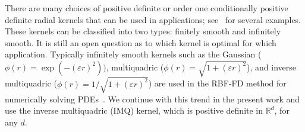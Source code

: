 \documentclass[smallextended]{svjour3}
\newcommand{\ep}{\varepsilon}
\begin{document}
There are many choices of positive definite or order one conditionally positive definite radial kernels that can be used in applications; see~\cite[Ch. 4, 8, 11]{Fasshauer:2007} for several examples. These kernels can be classified into two types: finitely smooth and infinitely smooth. It is still an open question as to which kernel is optimal for which application.  Typically infinitely smooth kernels such as the Gaussian ($\phi(r) = \exp(-(\ep r)^2))$, multiquadric ($\phi(r) = \sqrt{1 + (\ep r)^2}$), and inverse multiquadric ($\phi(r) = 1/\sqrt{1 + (\ep r)^2}$) are used in the RBF-FD method for numerically solving PDEs~\cite{ShuDing2003,Wright200699,Bayona2010,Davydov2011,FlyerLehto2012}.  We continue with this trend in the present work and use the inverse multiquadric (IMQ) kernel, which is positive definite in $\mathbb{R}^d$, for any $d$.  

\end{document}
